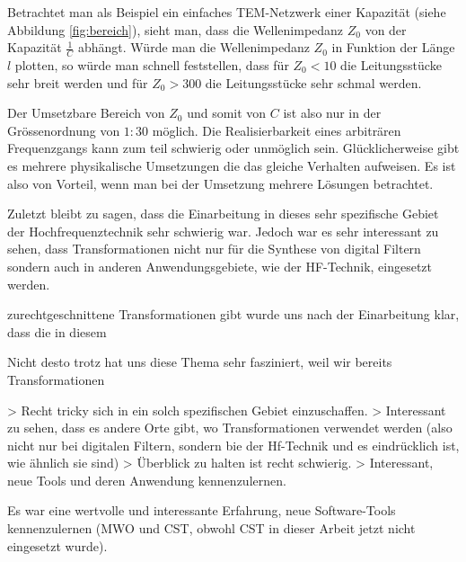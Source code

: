 Betrachtet  man als Beispiel  ein  einfaches  TEM-Netzwerk  einer  Kapazit\"at
(siehe Abbildung \ref{fig:bereich}), sieht man, dass die  Wellenimpedanz $Z_0$
von  der Kapazit\"at $\frac{1}{C}$ abh\"angt. W\"urde man  die  Wellenimpedanz
$Z_0$ in Funktion der L\"ange $l$ plotten, so w\"urde man schnell feststellen,
dass f\"ur $Z_0<10$ die Leitungsst\"ucke sehr breit werden und  f\"ur  $Z_0  >
300$ die Leitungsst\"ucke sehr schmal werden.

Der Umsetzbare Bereich von $Z_0$ und  somit  von  $C$  ist  also  nur  in  der
Gr\"ossenordnung von $1:30$ m\"oglich. Die Realisierbarkeit eines arbitr\"aren
Frequenzgangs    kann    zum    teil   schwierig   oder   unm\"oglich    sein.
Gl\"ucklicherweise gibt es  mehrere  physikalische Umsetzungen die das gleiche
Verhalten aufweisen.  Es  ist  also  von  Vorteil,  wenn man bei der Umsetzung
mehrere L\"osungen betrachtet.



Zuletzt bleibt zu sagen, dass die Einarbeitung in dieses sehr spezifische Gebiet der Hochfrequenztechnik sehr schwierig war. Jedoch war es sehr interessant zu sehen, dass Transformationen nicht nur für die Synthese von digital Filtern sondern auch in anderen Anwendungsgebiete, wie der HF-Technik,  eingesetzt werden.


zurechtgeschnittene Transformationen gibt   wurde uns nach der Einarbeitung klar, dass die in diesem 

Nicht desto trotz hat uns diese Thema sehr fasziniert, weil wir bereits Transformationen 

> Recht tricky sich in ein solch spezifischen Gebiet einzuschaffen. 
> Interessant zu sehen, dass es andere Orte gibt, wo Transformationen verwendet werden (also nicht nur bei digitalen Filtern, sondern bie der Hf-Technik und es eindrücklich ist, wie ähnlich sie sind)
> Überblick zu halten ist recht schwierig.
> Interessant, neue Tools und deren Anwendung kennenzulernen.

Es   war  eine  wertvolle  und  interessante  Erfahrung,  neue  Software-Tools
kennenzulernen  (MWO  und  CST,  obwohl  CST  in  dieser  Arbeit  jetzt  nicht
eingesetzt wurde).
